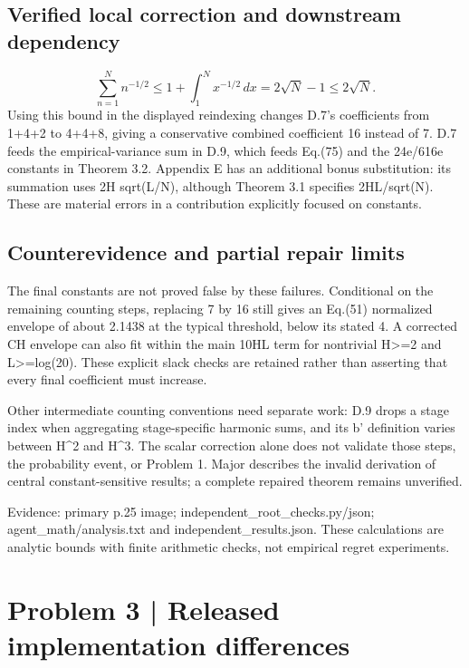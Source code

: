 \documentclass[10pt]{article}
\begin{document}
\subsection*{Verified local correction and downstream dependency}
\[\sum_{n=1}^Nn^{-1/2}\le1+\int_1^N x^{-1/2}\,dx=2\sqrt N-1\le2\sqrt N.\] Using this bound in the displayed reindexing changes D.7’s coefficients from 1+4+2 to 4+4+8, giving a conservative combined coefficient 16 instead of 7. D.7 feeds the empirical-variance sum in D.9, which feeds Eq.(75) and the 24e/616e constants in Theorem 3.2. Appendix E has an additional bonus substitution: its summation uses 2H sqrt(L/N), although Theorem 3.1 specifies 2HL/sqrt(N). These are material errors in a contribution explicitly focused on constants.\par
\subsection*{Counterevidence and partial repair limits}
The final constants are not proved false by these failures. Conditional on the remaining counting steps, replacing 7 by 16 still gives an Eq.(51) normalized envelope of about 2.1438 at the typical threshold, below its stated 4. A corrected CH envelope can also fit within the main 10HL term for nontrivial H>=2 and L>=log(20). These explicit slack checks are retained rather than asserting that every final coefficient must increase.\par
Other intermediate counting conventions need separate work: D.9 drops a stage index when aggregating stage-specific harmonic sums, and its b’ definition varies between H\textasciicircum{}2 and H\textasciicircum{}3. The scalar correction alone does not validate those steps, the probability event, or Problem 1. Major describes the invalid derivation of central constant-sensitive results; a complete repaired theorem remains unverified.\par
Evidence: primary p.25 image; independent\_root\_checks.py/json; agent\_math/analysis.txt and independent\_results.json. These calculations are analytic bounds with finite arithmetic checks, not empirical regret experiments.\par
\section*{Problem 3 | Released implementation differences}
\end{document}
